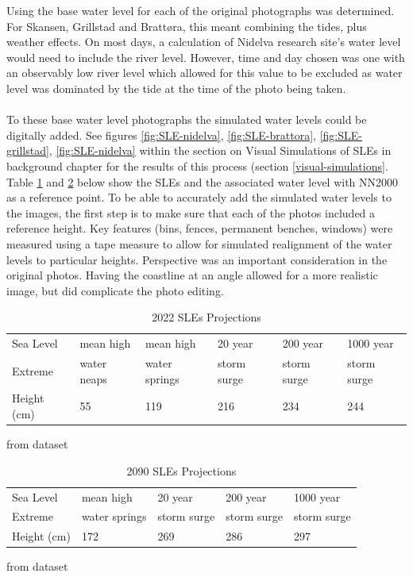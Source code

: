 Using \cite{tides_high_2022} the base water level for each of the original photographs was determined. For Skansen, Grillstad and Brattøra, this meant combining the tides, plus weather effects. On most days, a calculation of Nidelva research site's water level would need to include the river level. However, time and day chosen was one with an observably low river level which allowed for this value to be excluded as water level was dominated by the tide at the time of the photo being taken.   
\paragraph{}

To these base water level photographs the simulated water levels could be digitally added. See figures \ref{fig:SLE-nidelva}, \ref{fig:SLE-brattora}, \ref{fig:SLE-grillstad}, \ref{fig:SLE-nidelva} within the section on Visual Simulations of SLEs in background chapter for the results of this process (section \ref{visual-simulations}. Table \ref{tab:2022_sle_projections} and \ref{tab:2090_sle_projections} below show the SLEs and the associated water level with NN2000 as a reference point.  To be able to accurately add the simulated water levels to the images, the first step is to make sure that each of the photos included a reference height. Key features (bins, fences, permanent benches, windows) were measured using a tape measure to allow for simulated realignment of the water levels to particular heights. Perspective was an important consideration in the original photos. Having the coastline at an angle allowed for a more realistic image, but did complicate the photo editing. 

\begin{table}[h!]
    \centering
    \begin{tabular}{|l|l|l|l|l|l|}
    \hline
     Sea Level &   mean high  & mean high  & 20 year  & 200 year   & 1000 year  \\ \newline
     Extreme &  water neaps & water springs &  storm surge  & storm surge  &  storm surge  \\ \hline
       Height (cm) &  55 & 119 & 216 & 234 & 244 \\ \hline
    \end{tabular}
    \caption{2022 SLEs Projections } from {\cite{kartverket_se_2021} dataset}
    \label{tab:2022_sle_projections}
\end{table}

\begin{table}[h!]
    \centering
    \begin{tabular}{|l|l|l|l|l|}
    \hline
       Sea Level &  mean high & 20 year   & 200 year &  1000 year   \\ \newline
       Extreme & water springs &  storm surge  &  storm surge  &  storm surge  \\ \hline
       Height (cm) & 172 & 269 & 286 & 297 \\ \hline
    \end{tabular}
    \caption{2090 SLEs Projections}
  from {\cite{kartverket_se_2021} dataset}
    \label{tab:2090_sle_projections}
\end{table}

